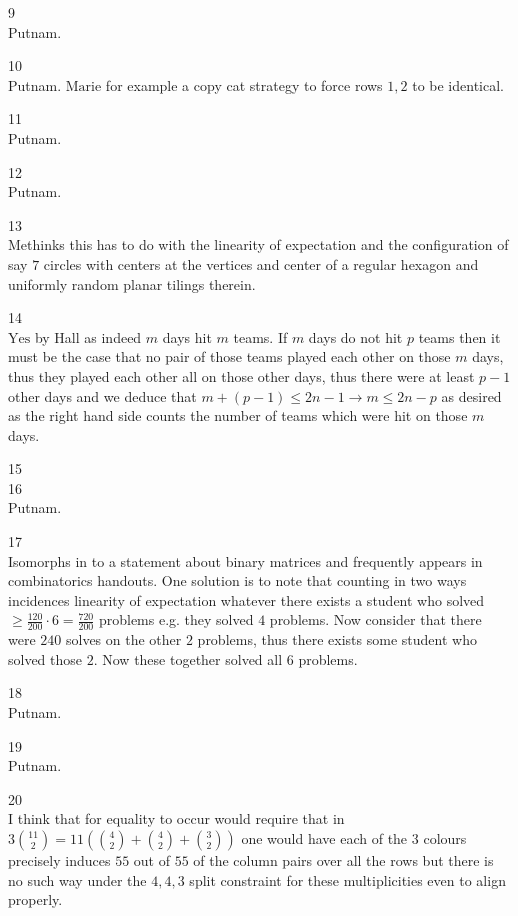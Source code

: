 9 \\
Putnam.

10 \\
Putnam. $\boxed{\text{Marie}}$ for example a copy cat strategy to force rows $1,2$ to be identical.

11 \\
Putnam.

12 \\
Putnam.

13 \\
Methinks this has to do with the linearity of expectation and the configuration of say $7$ circles with centers at the vertices and center of a regular hexagon and uniformly random planar tilings therein.

14 \\
$\boxed{\text{Yes}}$ by Hall as indeed $m$ days hit $m$ teams. If $m$ days do not hit $p$ teams then it must be the case that no pair of those teams played each other on those $m$ days, thus they played each other all on those other days, thus there were at least $p-1$ other days and we deduce that $m+(p-1) \le 2n-1 \to m \le 2n-p$ as desired as the right hand side counts the number of teams which were hit on those $m$ days.

15 \\


16 \\
Putnam.

17 \\
Isomorphs in to a statement about binary matrices and frequently appears in combinatorics handouts. One solution is to note that counting in two ways incidences linearity of expectation whatever there exists a student who solved $\ge \frac{120}{200} \cdot 6=\frac{720}{200}$ problems e.g. they solved $4$ problems. Now consider that there were $240$ solves on the other $2$ problems, thus there exists some student who solved those $2$. Now these together solved all $6$ problems.

18 \\
Putnam.

19 \\
Putnam.

20 \\
I think that for equality to occur would require that in $3 \binom{11}{2}=11\left(\binom{4}{2}+\binom{4}{2}+\binom{3}{2} \right)$ one would have each of the $3$ colours precisely induces $55$ out of $55$ of the column pairs over all the rows but there is no such way under the $4,4,3$ split constraint for these multiplicities even to align properly.

